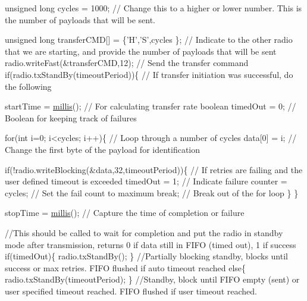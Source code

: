 \begin{DoxyCodeInclude}
    \textcolor{keywordtype}{unsigned} \textcolor{keywordtype}{long} cycles = 1000;                              \textcolor{comment}{// Change this to a higher or lower number.
       This is the number of payloads that will be sent.   }
    
    \textcolor{keywordtype}{unsigned} \textcolor{keywordtype}{long} transferCMD[] = \{\textcolor{charliteral}{'H'},\textcolor{charliteral}{'S'},cycles \};          \textcolor{comment}{// Indicate to the other radio that we are
       starting, and provide the number of payloads that will be sent }
    radio.writeFast(&transferCMD,12);                         \textcolor{comment}{// Send the transfer command}
    \textcolor{keywordflow}{if}(radio.txStandBy(timeoutPeriod))\{                       \textcolor{comment}{// If transfer initiation was successful, do
       the following}
   
        startTime = \hyperlink{group__Porting__General_gad5b3ec1ce839fa1c4337a7d0312e9749}{millis}();                                 \textcolor{comment}{// For calculating transfer rate}
        \textcolor{keywordtype}{boolean} timedOut = 0;                                 \textcolor{comment}{// Boolean for keeping track of failures}
      
        \textcolor{keywordflow}{for}(\textcolor{keywordtype}{int} i=0; i<cycles; i++)\{                          \textcolor{comment}{// Loop through a number of cycles}
          data[0] = i;                                        \textcolor{comment}{// Change the first byte of the payload for
       identification}
       
          \textcolor{keywordflow}{if}(!radio.writeBlocking(&data,32,timeoutPeriod))\{   \textcolor{comment}{// If retries are failing and the user
       defined timeout is exceeded}
              timedOut = 1;                                   \textcolor{comment}{// Indicate failure}
              counter = cycles;                               \textcolor{comment}{// Set the fail count to maximum}
              \textcolor{keywordflow}{break};                                          \textcolor{comment}{// Break out of the for loop}
          \}  
        \}    
  
   
        stopTime = \hyperlink{group__Porting__General_gad5b3ec1ce839fa1c4337a7d0312e9749}{millis}();                                  \textcolor{comment}{// Capture the time of completion or
       failure}
   
       \textcolor{comment}{//This should be called to wait for completion and put the radio in standby mode after transmission,
       returns 0 if data still in FIFO (timed out), 1 if success}
       \textcolor{keywordflow}{if}(timedOut)\{ radio.txStandBy(); \}                     \textcolor{comment}{//Partially blocking standby, blocks until
       success or max retries. FIFO flushed if auto timeout reached}
       \textcolor{keywordflow}{else}\{ radio.txStandBy(timeoutPeriod);     \}            \textcolor{comment}{//Standby, block until FIFO empty (sent) or
       user specified timeout reached. FIFO flushed if user timeout reached.}
   

\end{DoxyCodeInclude}
